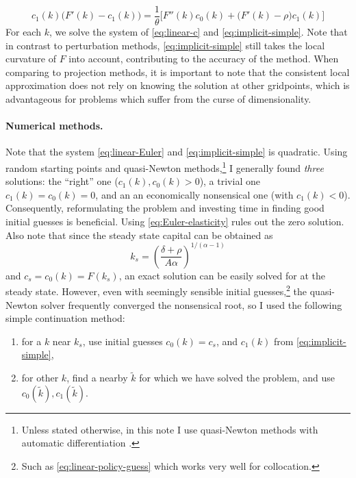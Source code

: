 \documentclass[a4paper,11pt]{article}
\newcommand{\tk}{\tilde{k}}
\begin{document}
\begin{equation}
  \label{eq:implicit-simple}
  c_1(k)\bigl( F'(k) - c_1(k) \bigr) = \frac{1}{\theta}\biggl[ F''(k) c_0(k) + \bigl( F'(k) - \rho \bigr) c_1(k) \biggr]
\end{equation}
For each $k$, we solve the system of \eqref{eq:linear-c} and \eqref{eq:implicit-simple}.
Note that in contrast to perturbation methods, \eqref{eq:implicit-simple} still takes the local curvature of $F$ into account, contributing to the accuracy of the method. When comparing to projection methods, it is important to note that the consistent local approximation does not rely on knowing the solution at other gridpoints, which is advantageous for problems which suffer from the curse of dimensionality.

\paragraph{Numerical methods.}

Note that the system \eqref{eq:linear-Euler} and \eqref{eq:implicit-simple} is quadratic. Using random starting points and quasi-Newton methods,\footnote{Unless stated otherwise, in this note I use quasi-Newton methods with automatic differentiation \parencite{RevelsLubinPapamarkou2016}.} I generally found  \emph{three} solutions: the ``right'' one ($c_1(k), c_0(k) > 0$), a trivial one $c_1(k) = c_0(k) = 0$, and an an economically nonsensical one (with $c_1(k) < 0$). Consequently, reformulating the problem and investing time in finding good initial guesses is beneficial. Using \eqref{eq:Euler-elasticity} rules out the zero solution. Also note that since the steady state capital can be obtained as
\begin{equation}
  k_s = \left(\frac{\delta+\rho}{A\alpha}\right)^{1/(\alpha-1)}
\end{equation}
and $c_s=c_0(k) = F(k_s)$, an exact solution can be easily solved for at the steady state. However, even with seemingly sensible initial guesses,\footnote{Such as \eqref{eq:linear-policy-guess} which works very well for collocation.} the quasi-Newton solver frequently converged the nonsensical root, so I used the following simple continuation method:
\begin{enumerate}
\item for a $k$ near $k_s$, use initial guesses $c_0(k)=c_s$, and $c_1(k)$ from \eqref{eq:implicit-simple},
\item for other $k$, find a nearby $\tk$ for which we have solved the problem, and use $c_0(\tk), c_1(\tk)$.
\end{enumerate}
\end{document}
